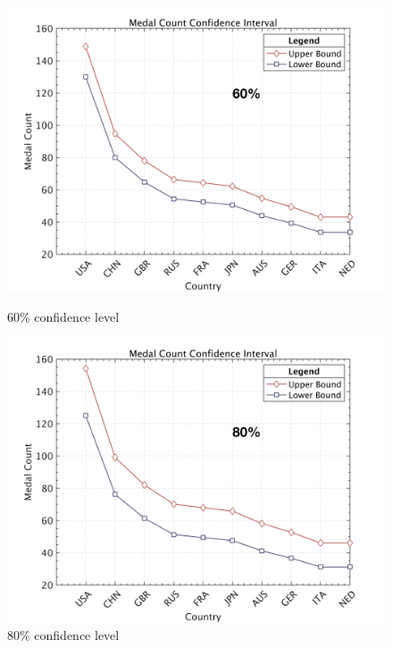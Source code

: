 \documentclass{mcmthesis}  %
\begin{document}
\begin{figure}[H]
    \centering
    \begin{minipage}{0.45\textwidth}
        \centering
        \includegraphics[width=\linewidth]{5个置信区间/60.png}
        \caption{60\% confidence level}
    \end{minipage}\hfill
    \begin{minipage}{0.45\textwidth}
        \centering
        \includegraphics[width=\linewidth]{5个置信区间/80.png}
        \caption{80\% confidence level}
    \end{minipage}
    \begin{minipage}{0.45\textwidth}
        \centering

\end{minipage}
\end{figure}
\end{document}
